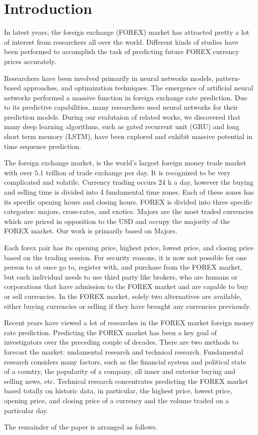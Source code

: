 \section{Introduction}

In latest years, the foreign exchange (FOREX) market has attracted pretty a lot of interest from researchers all over the world. Different kinds of studies have been performed to accomplish the task of predicting future FOREX currency prices accurately.

Researchers have been involved primarily in neural networks models, pattern-based approaches, and optimization techniques. 
The emergence of artificial neural networks performed a massive function in foreign exchange rate prediction. Due to its predictive capabilities, many researchers used neural networks for their prediction models. During our evalutaion of related works, we discovered that many deep learning algorithms, such as gated recurrent unit (GRU) and long short term memory (LSTM), have been explored and exhibit massive potential in time sequence prediction.

The foreign exchange market, is the world’s largest foreign money trade market with over $5.1$ trillion of trade exchange per day. It is recognized to be very complicated and volatile. Currency trading occurs 24 h a day, however the buying and selling time is divided into 4 fundamental time zones. Each of these zones has its specific opening hours and closing hours.
FOREX is divided into three specific categories: majors, cross-rates, and exotics. Majors are the most traded currencies which are priced in opposition to the USD and occupy the majority of the FOREX market. Our work is primarily based on Majors.

Each forex pair has its opening price, highest price, lowest price, and closing price based on the trading session. For security reasons, it is now not possible for one person to at once go to, register with, and purchase from the FOREX market,  but each individual needs to use third party like brokers, who are humans or corporations that have admission to the FOREX market and are capable to buy or sell currencies. In the FOREX market, solely two alternatives are available, either buying currencies or selling if they have brought any currencies previously. 

Recent years have viewed a lot of researches in the FOREX market foreign money rate prediction. Predicting the FOREX market has been a key goal of investigators over the preceding couple of decades. There are two methods to forecast the market: undamental research and technical research. Fundamental research considers many factors, such as the financial system and political state of a country, the popularity of a company, all inner and exterior buying and selling news, etc. Technical research concentrates predicting the FOREX market based totally on historic data, in particular, the highest price, lowest price, opening price, and closing price of a currency and the volume traded on a particular day. 

The remainder of the paper is arranged as follows.
